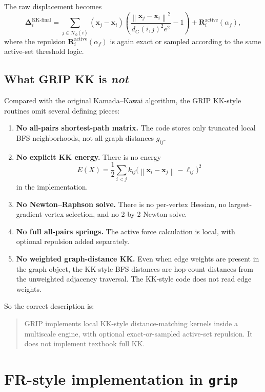 \documentclass[11pt]{article}
\newcommand{\vect}[1]{\boldsymbol{#1}}
\newcommand{\norm}[1]{\left\lVert #1 \right\rVert}
\begin{document}
The raw displacement becomes
\[
\vect{\Delta}_i^{\text{KK-final}}
=
\sum_{j \in \mathcal{N}_{0}(i)}
(\vect{x}_j - \vect{x}_i)
\left(
\frac{\norm{\vect{x}_j - \vect{x}_i}^2}{d_G(i,j)^2 e^2}
- 1
\right)
+
\vect{R}_i^{\text{active}}(\alpha_f),
\]
where the repulsion $\vect{R}_i^{\text{active}}(\alpha_f)$ is again exact or
sampled according to the same active-set threshold logic.

\subsection{What GRIP KK is \emph{not}}

Compared with the original Kamada--Kawai algorithm, the GRIP KK-style routines
omit several defining pieces:
\begin{enumerate}[leftmargin=1.5em]
\item \textbf{No all-pairs shortest-path matrix.} The code stores only truncated
local BFS neighborhoods, not all graph distances $g_{ij}$.

\item \textbf{No explicit KK energy.} There is no energy
\[
E(X) = \frac{1}{2} \sum_{i<j} k_{ij}\bigl(\norm{\vect{x}_i - \vect{x}_j} - \ell_{ij}\bigr)^2
\]
in the implementation.

\item \textbf{No Newton--Raphson solve.} There is no per-vertex Hessian, no
largest-gradient vertex selection, and no 2-by-2 Newton solve.

\item \textbf{No full all-pairs springs.} The active force calculation is local,
with optional repulsion added separately.

\item \textbf{No weighted graph-distance KK.} Even when edge weights are present
in the graph object, the KK-style BFS distances are hop-count distances from the
unweighted adjacency traversal. The KK-style code does not read edge weights.
\end{enumerate}

So the correct description is:
\begin{quote}
GRIP implements local KK-style distance-matching kernels inside a multiscale
engine, with optional exact-or-sampled active-set repulsion. It does not
implement textbook full KK.
\end{quote}

\section{FR-style implementation in \texttt{grip}}
\end{document}
